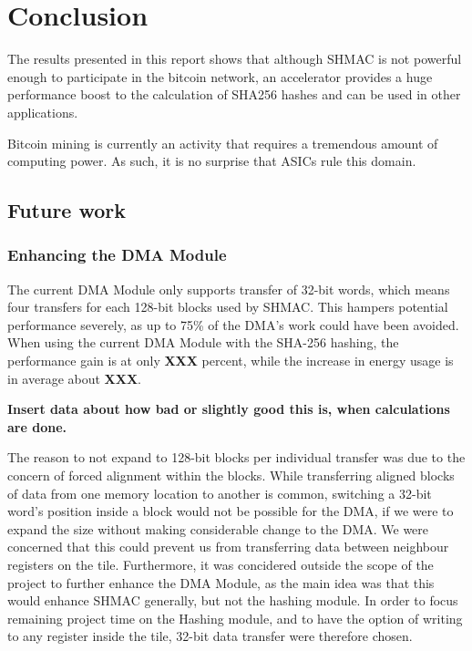 \chapter{Conclusion}
\label{cha:conclusion}

The results presented in this report shows that although SHMAC is not powerful
enough to participate in the bitcoin network, an accelerator provides a huge
performance boost to the calculation of SHA256 hashes and can be used in other
applications.

Bitcoin mining is currently an activity that requires a tremendous amount of computing power.
As such, it is no surprise that ASICs rule this domain.

\section{Future work}

\subsection{Enhancing the DMA Module}

The current DMA Module only supports transfer of 32-bit words, which means four transfers for each 128-bit blocks used by SHMAC.
This hampers potential performance severely, as up to 75\% of the DMA's work could have been avoided.
When using the current DMA Module with the SHA-256 hashing, the performance gain is at only \textbf{XXX} percent, while the increase in energy usage is in average about  \textbf{XXX}.

\textbf{Insert data about how bad or slightly good this is, when calculations are done.} 

The reason to not expand to 128-bit blocks per individual transfer was due to the concern of forced alignment within the blocks.
While transferring aligned blocks of data from one memory location to another is common, switching a 32-bit word's position inside a block would not be possible for the DMA, if we were to expand the size without making considerable change to the DMA. 
We were concerned that this could prevent us from transferring data between neighbour registers on the tile.
Furthermore, it was concidered outside the scope of the project to further enhance the DMA Module, as the main idea was that this would enhance SHMAC generally, but not the hashing module.
In order to focus remaining project time on the Hashing module, and to have the option of writing to any register inside the tile, 32-bit data transfer were therefore chosen.

